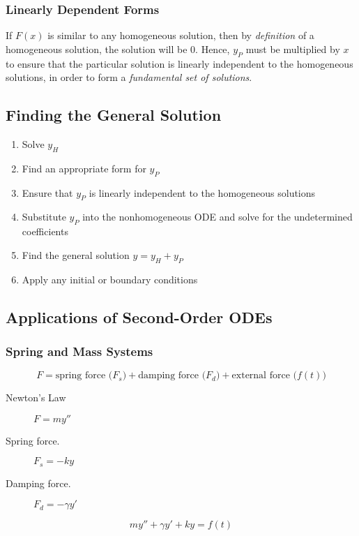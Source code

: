 \documentclass{article}
\begin{document}
\subsubsection{Linearly Dependent Forms}
If \(F\left( x \right)\) is similar to any homogeneous solution, then
by \textit{definition} of a homogeneous solution, the solution will be
\(0\). Hence, \(y_P\) must be multiplied by \(x\) to ensure that the
particular solution is linearly independent to the homogeneous
solutions, in order to form a \textit{fundamental set of solutions}.
\subsection{Finding the General Solution}
\begin{enumerate}
    \item Solve \(y_H\)
    \item Find an appropriate form for \(y_P\)
    \item Ensure that \(y_P\) is linearly independent to the
          homogeneous solutions
    \item Substitute \(y_P\) into the nonhomogeneous ODE and solve for
          the undetermined coefficients
    \item Find the general solution \(y = y_H + y_P\)
    \item Apply any initial or boundary conditions
\end{enumerate}
\subsection{Applications of Second-Order ODEs}
\subsubsection{Spring and Mass Systems}
\begin{equation*}
    F = \text{spring force (\(F_s\))} + \text{damping force (\(F_d\))} + \text{external force (\(f\left( t \right)\))}
\end{equation*}
\begin{description}
    \item[Newton's Law] \(F = m y''\)
    \item[Spring force.] \(F_s = -k y\)
    \item[Damping force.] \(F_d = -\gamma y'\)
\end{description}
\begin{equation*}
    m y'' + \gamma y' + k y = f\left( t \right)
\end{equation*}
\end{document}

